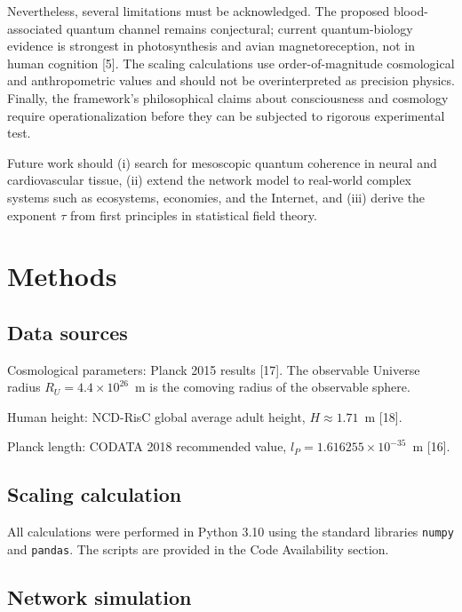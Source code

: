 \documentclass[11pt,a4paper]{article}
\begin{document}
Nevertheless, several limitations must be acknowledged. The proposed blood-associated quantum channel remains conjectural; current quantum-biology evidence is strongest in photosynthesis and avian magnetoreception, not in human cognition [5]. The scaling calculations use order-of-magnitude cosmological and anthropometric values and should not be overinterpreted as precision physics. Finally, the framework's philosophical claims about consciousness and cosmology require operationalization before they can be subjected to rigorous experimental test.

Future work should (i) search for mesoscopic quantum coherence in neural and cardiovascular tissue, (ii) extend the network model to real-world complex systems such as ecosystems, economies, and the Internet, and (iii) derive the exponent $\tau$ from first principles in statistical field theory.

\section{Methods}

\subsection{Data sources}

Cosmological parameters: Planck 2015 results [17]. The observable Universe radius $R_U = 4.4\times 10^{26}$~m is the comoving radius of the observable sphere.

Human height: NCD-RisC global average adult height, $H \approx 1.71$~m [18].

Planck length: CODATA 2018 recommended value, $l_P = 1.616255\times 10^{-35}$~m [16].

\subsection{Scaling calculation}

All calculations were performed in Python 3.10 using the standard libraries \texttt{numpy} and \texttt{pandas}. The scripts are provided in the Code Availability section.

\subsection{Network simulation}
\end{document}
